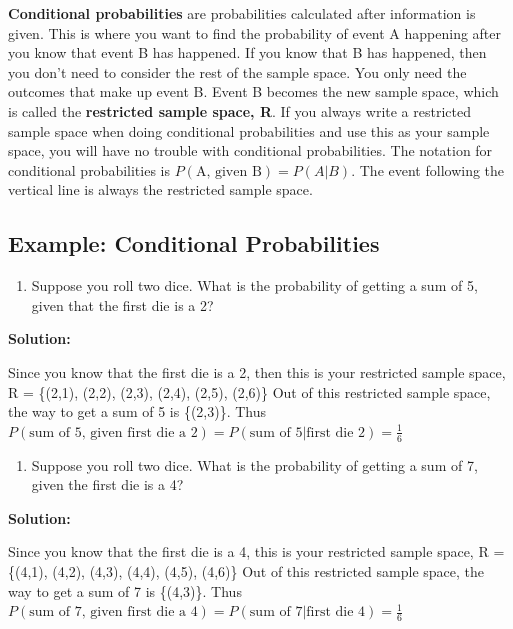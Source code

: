 \documentclass[
]{book}
\providecommand{\tightlist}{%
  \setlength{\itemsep}{0pt}\setlength{\parskip}{0pt}}
\begin{document}
\textbf{Conditional probabilities} are probabilities calculated after information is given. This is where you want to find the probability of event A happening after you know that event B has happened. If you know that B has happened, then you don't need to consider the rest of the sample space. You only need the outcomes that make up event B. Event B becomes the new sample space, which is called the \textbf{restricted sample space, R}. If you always write a restricted sample space when doing conditional probabilities and use this as your sample space, you will have no trouble with conditional probabilities. The notation for conditional probabilities is \(P(\text{A, given B})=P(A|B)\). The event following the vertical line is always the restricted sample space.

\hypertarget{example-conditional-probabilities}{%
\subsection{Example: Conditional Probabilities}\label{example-conditional-probabilities}}

\begin{enumerate}
\def\labelenumi{\alph{enumi}.}
\tightlist
\item
  Suppose you roll two dice. What is the probability of getting a sum of 5, given that the first die is a 2?
\end{enumerate}

\textbf{Solution:}

Since you know that the first die is a 2, then this is your restricted sample space, R = \{(2,1), (2,2), (2,3), (2,4), (2,5), (2,6)\} Out of this restricted sample space, the way to get a sum of 5 is
\{(2,3)\}. Thus \(P(\text{sum of 5, given first die a 2})=P(\text{sum of 5}|\text{first die 2})=\frac{1}{6}\)

\begin{enumerate}
\def\labelenumi{\alph{enumi}.}
\setcounter{enumi}{1}
\tightlist
\item
  Suppose you roll two dice. What is the probability of getting a sum of 7, given the first die is a 4?
\end{enumerate}

\textbf{Solution:}

Since you know that the first die is a 4, this is your restricted sample space, R = \{(4,1), (4,2), (4,3), (4,4), (4,5), (4,6)\} Out of this restricted sample space, the way to get a sum of 7 is \{(4,3)\}. Thus \(P(\text{sum of 7, given first die a 4})=P(\text{sum of 7}|\text{first die 4})=\frac{1}{6}\)
\end{document}
